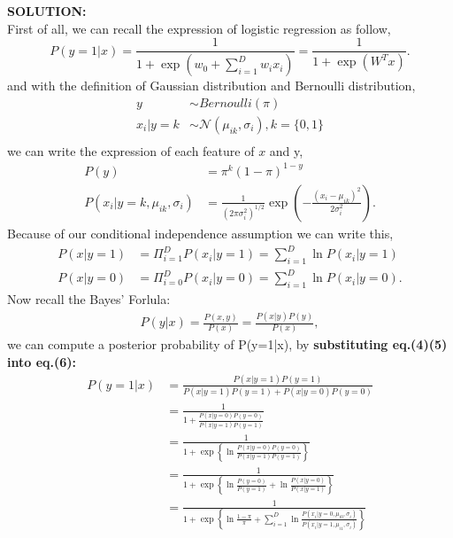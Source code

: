 \documentclass[UTF8,12pt, a4paper]{ctexart}
\begin{document}
\begin{tcolorbox}
\textbf{\large{SOLUTION: }}\\
First of all, we can recall the expression of logistic regression as follow,
\begin{equation}
  P(y=1|x)= \frac{1}{1+\exp(w_0 + \sum_{i=1}^{D}{w_ix_i})}
  =\frac{1}{1+\exp(W^Tx)}.
\end{equation}
and with the definition of Gaussian distribution and Bernoulli distribution,
$$
\begin{aligned}
  y &\sim Bernoulli(\pi) \\
  x_i|y=k & \sim \mathcal{N}(\mu_{ik}, \sigma_i), k= \{ 0,1\} \\
\end{aligned}
$$
we can write the expression of each feature of $x$ and y,
\begin{align}
  P(y)&=\pi^k(1-\pi)^{1-y} \\
  P(x_i|y=k,\mu_{ik}, \sigma_i) &= \frac{1}{(2\pi\sigma_i ^2)^{1/2}} \exp\left(-\frac{(x_i-\mu_{ik})^2}{2\sigma_i^2}\right).
\end{align}
Because of our conditional independence assumption we can write this,
\begin{align}
    P(x|y=1) &= \Pi_{i=1}^{D}{P(x_i|y=1)}=\sum_{i=1}^{D}{\ln P(x_i|y=1)} \\
    P(x|y=0) &= \Pi_{i=0}^{D}{P(x_i|y=0)}=\sum_{i=1}^{D}{\ln P(x_i|y=0)}.
\end{align}
Now recall the Bayes' Forlula:
\begin{align}
  P(y|x)=\frac{P(x,y)}{P(x)}=\frac{P(x|y)P(y)}{P(x)},
\end{align}
we can compute a posterior probability of P(y=1|x), by \textbf{substituting eq.(4)(5) into eq.(6):}
\begin{equation}
  \begin{aligned}
    P(y=1|x)&=\frac{P(x|y=1)P(y=1)}{P(x|y=1)P(y=1)+ P(x|y=0)P(y=0)} \\
    & = \frac{1}{1+{\frac{P(x|y=0)P(y=0)}{P(x|y=1)P(y=1)}}}  \\
    & = \frac{1}{1+\exp\left\{ \ln \frac{P(x|y=0)P(y=0)}{P(x|y=1)P(y=1)}\right\}}  \\
    & = \frac{1}{1+\exp\left\{ \ln\frac{P(y=0)}{P(y=1)} +\ln \frac{P(x|y=0)}{P(x|y=1)}\right\}}  \\
    & = \frac{1}{1+\exp\left\{ \ln\frac{1-\pi}{\pi} +\sum_{i=1}^{D}\ln \frac{P(x_i|y=0, \mu_{i0}, \sigma_i)}{P(x_i|y=1, \mu_{i1}, \sigma_i)}\right\}} 
  \end{aligned}

\end{equation}
\end{tcolorbox}
\end{document}
